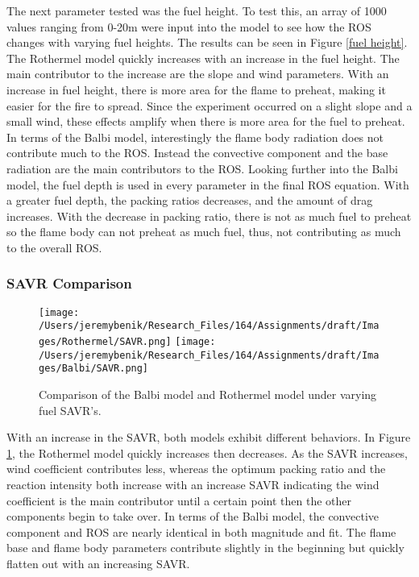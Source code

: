 \documentclass{article}
\begin{document}
\indent The next parameter tested was the fuel height. To test this, an array of 1000 values ranging from 0-20m were input into the model to see how the ROS changes with varying fuel heights. The results can be seen in Figure \ref{fuel height}. The Rothermel model quickly increases with an increase in the fuel height. The main contributor to the increase are the slope and wind parameters. With an increase in fuel height, there is more area for the flame to preheat, making it easier for the fire to spread. Since the experiment occurred on a slight slope and a small wind, these effects amplify when there is more area for the fuel to preheat. In terms of the Balbi model, interestingly the flame body radiation does not contribute much to the ROS. Instead the convective component and the base radiation are the main contributors to the ROS. Looking further into the Balbi model, the fuel depth is used in every parameter in the final ROS equation. With a greater fuel depth, the packing ratios decreases, and the amount of drag increases. With the decrease in packing ratio, there is not as much fuel to preheat so the flame body can not preheat as much fuel, thus, not contributing as much to the overall ROS.
\subsubsection{SAVR Comparison}
\begin{figure}
\centering
  \texttt{[image: /Users/jeremybenik/Research\_Files/164/Assignments/draft/Images/Rothermel/SAVR.png]}
  \texttt{[image: /Users/jeremybenik/Research\_Files/164/Assignments/draft/Images/Balbi/SAVR.png]}
  \caption{Comparison of the Balbi model and Rothermel model under varying fuel SAVR's.}
  \label{SAVR}
\end{figure}


\indent With an increase in the SAVR, both models exhibit different behaviors. In Figure \ref{SAVR}, the Rothermel model quickly increases then decreases. As the SAVR increases, wind coefficient contributes less, whereas the optimum packing ratio and the reaction intensity both increase with an increase SAVR indicating the wind coefficient is the main contributor until a certain point then the other components begin to take over. In terms of the Balbi model, the convective component and ROS are nearly identical in both magnitude and fit. The flame base and flame body parameters contribute slightly in the beginning but quickly flatten out with an increasing SAVR.
\end{document}
